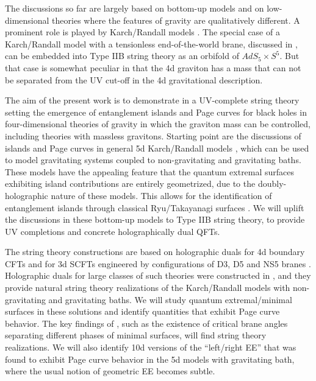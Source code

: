 \documentclass[aps,prd,11pt,notitlepage,longbibliography,nofootinbib,tightenlines,preprintnumbers]{revtex4-1}
\begin{document}
The discussions so far are largely based on bottom-up models and on low-dimensional theories where the features of gravity are qualitatively different. 
A prominent role is played by Karch/Randall models \cite{Karch:2000ct,Karch:2000gx}.
The special case of a Karch/Randall model with a tensionless end-of-the-world brane, discussed in \cite{Geng:2020qvw}, can be embedded into Type IIB string theory as an orbifold of $AdS_5\times S^5$. But that case is somewhat peculiar in that the 4d graviton has a mass that can not be separated from the UV cut-off in the 4d gravitational description.

The aim of the present work is to demonstrate in a UV-complete string theory setting the emergence of entanglement islands and Page curves for black holes in four-dimensional theories of gravity in which the graviton mass can be controlled, including theories with massless gravitons.
%
Starting point are the discussions of islands and Page curves in general 5d Karch/Randall models \cite{Chen:2020uac,Chen:2020hmv,Geng:2020qvw,Geng:2020fxl,Rozali:2019day}, which can be used to model gravitating systems coupled to non-gravitating and gravitating baths.
These models have the appealing feature that the quantum extremal surfaces \cite{Engelhardt:2014gca,Faulkner:2013ana} exhibiting island contributions are entirely geometrized, due to the doubly-holographic nature of these models. This allows for the identification of entanglement islands through classical Ryu/Takayanagi surfaces \cite{Ryu:2006bv}. 
We will uplift the discussions in these bottom-up models to Type IIB string theory, to provide UV completions and concrete holographically dual QFTs.

The string theory constructions are based on holographic duals for 4d boundary CFTs and for 3d SCFTs  engineered by configurations of D3, D5 and NS5 branes \cite{Gaiotto:2008sa,Gaiotto:2008sd,Gaiotto:2008ak}. Holographic duals for large classes of such theories were constructed in \cite{DHoker:2007zhm,DHoker:2007hhe,Aharony:2011yc,Assel:2011xz}, and they provide natural string theory realizations of the Karch/Randall models with non-gravitating and gravitating baths.
We will study quantum extremal/minimal surfaces in these solutions and identify quantities that exhibit Page curve behavior.
The key findings of \cite{Geng:2020fxl,Geng:2020qvw}, such as the existence of critical brane angles separating different phases of minimal surfaces, will find string theory realizations. We will also identify 10d versions of the ``left/right EE'' that was found to exhibit Page curve behavior in the 5d models with gravitating bath, where the usual notion of geometric EE becomes subtle.
\end{document}
